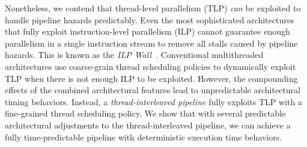 Nonetheless, we contend that thread-level parallelism (TLP) \emph{can} be exploited to handle pipeline hazards predictably. 
Even the most sophisticated architectures that fully exploit instruction-level parallelism (ILP) cannot guarantee enough parallelism in a single instruction stream to remove all stalls caused by pipeline hazards. 
This is known as the \emph{ILP Wall}~\cite{Wall:1991:LIP:106975.106991}. 
Conventional multithreaded architectures use coarse-grain thread scheduling policies to dynamically exploit TLP when there is not enough ILP to be exploited.    
However, the compounding effects of the combined architectural features lead to unpredictable architectural timing behaviors.
Instead, a \emph{thread-interleaved pipeline} fully exploits TLP with a fine-grained thread scheduling policy.
We show that with several predictable architectural adjustments to the thread-interleaved pipeline, we can achieve a fully time-predictable pipeline 
with deterministic execution time behaviors.     

